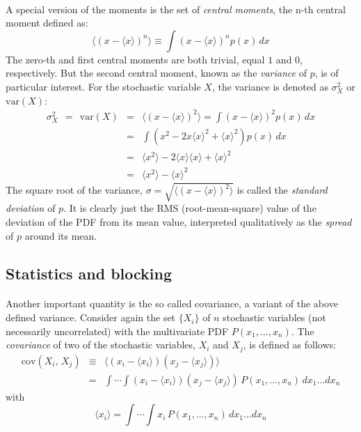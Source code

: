 \documentclass[%
twoside,                 %
final,                   %
10pt]{article}
\begin{document}
\paragraph{}
A special version of the moments is the set of \emph{central moments},
the n-th central moment defined as:
\[
\langle (x-\langle x \rangle )^n\rangle \equiv \int\! (x-\langle x\rangle)^n p(x)\,dx
\]
The zero-th and first central moments are both trivial, equal $1$ and
$0$, respectively. But the second central moment, known as the
\emph{variance} of $p$, is of particular interest. For the stochastic
variable $X$, the variance is denoted as $\sigma^2_X$ or $\mathrm{var}(X)$:
\begin{eqnarray}
\sigma^2_X\ \ =\ \ \mathrm{var}(X) & = & \langle (x-\langle x\rangle)^2\rangle =
\int\! (x-\langle x\rangle)^2 p(x)\,dx\\
& = & \int\! \left(x^2 - 2 x \langle x\rangle^{2} +
  \langle x\rangle^2\right)p(x)\,dx\\
& = & \langle x^2\rangle - 2 \langle x\rangle\langle x\rangle + \langle x\rangle^2\\
& = & \langle x^2\rangle - \langle x\rangle^2
\end{eqnarray}
The square root of the variance, $\sigma =\sqrt{\langle (x-\langle x\rangle)^2\rangle}$ is called the \emph{standard deviation} of $p$. It is clearly just the RMS (root-mean-square)
value of the deviation of the PDF from its mean value, interpreted
qualitatively as the \emph{spread} of $p$ around its mean.



\subsection{Statistics and blocking}

\paragraph{}
Another important quantity is the so called covariance, a variant of
the above defined variance. Consider again the set $\{X_i\}$ of $n$
stochastic variables (not necessarily uncorrelated) with the
multivariate PDF $P(x_1,\dots,x_n)$. The \emph{covariance} of two
of the stochastic variables, $X_i$ and $X_j$, is defined as follows:
\begin{eqnarray}
\mathrm{cov}(X_i,\,X_j) &\equiv& \langle (x_i-\langle x_i\rangle)(x_j-\langle x_j\rangle)\rangle
\nonumber\\
&=&
\int\!\cdots\!\int\!(x_i-\langle x_i \rangle)(x_j-\langle x_j \rangle)\,
P(x_1,\dots,x_n)\,dx_1\dots dx_n
\label{eq:def_covariance}
\end{eqnarray}
with
\[
\langle x_i\rangle =
\int\!\cdots\!\int\!x_i\,P(x_1,\dots,x_n)\,dx_1\dots dx_n
\]
\end{document}
